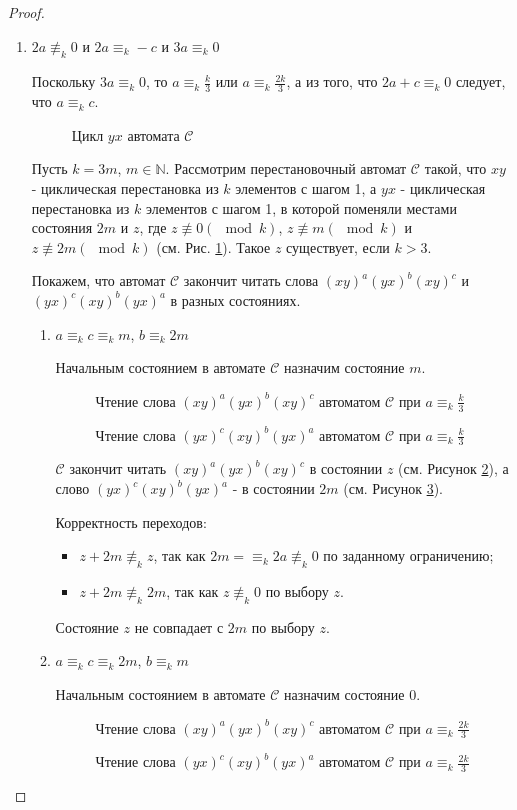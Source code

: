 \documentclass[12pt]{article}
\newcommand{\scalingimage}[3]{
	\begin{figure}
		\center{
			\texttt{[image: \#1]}
		}
		\caption{#3}
		\label{fig:#1}
	\end{figure}
}
\begin{document}
\begin{proof}
\begin{enumerate}
			\item $2a \not \equiv_k 0$ и $2a \equiv_k -c$ и $3a \equiv_k 0$
			
			Поскольку $3a \equiv_k 0$, то $a \equiv_k \frac{k}{3}$ или $a \equiv_k \frac{2k}{3}$, а из того, что $2a+c \equiv_k 0$ следует, что $a \equiv_k c$.
			
			\scalingimage{cycle_2m_z}{0.5}{Цикл $yx$ автомата $\mathscr{C}$}
			
			Пусть $k = 3m$, $m \in \mathbb{N}$.
			Рассмотрим перестановочный автомат $\mathscr{C}$ такой, что $xy$ - циклическая перестановка из $k$ элементов с шагом 1, а $yx$ - циклическая перестановка из $k$ элементов с шагом 1, в которой поменяли местами состояния $2m$ и $z$, где $z \not \equiv 0 (\mod k)$, $z \not \equiv m (\mod k)$ и $z \not \equiv 2m (\mod k)$ (см. Рис. \ref{fig:cycle_2m_z}). Такое $z$ существует, если $k > 3$.
			
			Покажем, что автомат $\mathscr{C}$ закончит читать слова $(xy)^a(yx)^b(xy)^c$ и $(yx)^c(xy)^b(yx)^a$ в разных состояниях.
			
			\begin{enumerate}
				\item $a \equiv_k c \equiv_k m$, $b \equiv_k 2m$
				
				Начальным состоянием в автомате $\mathscr{C}$ назначим состояние $m$.
				\scalingimage{process1_2m_z}{0.5}{Чтение слова $(xy)^a(yx)^b(xy)^c$ автоматом $\mathscr{C}$ при $a \equiv_k \frac{k}{3}$}
				\scalingimage{process2_2m_z}{0.5}{Чтение слова $(yx)^c(xy)^b(yx)^a$ автоматом $\mathscr{C}$ при $a \equiv_k \frac{k}{3}$}
				
				$\mathscr{C}$ закончит читать $(xy)^a(yx)^b(xy)^c$ в состоянии $z$ (см. Рисунок \ref{fig:process1_2m_z}), а слово $(yx)^c(xy)^b(yx)^a$ - в состоянии $2m$ (см. Рисунок \ref{fig:process2_2m_z}).
				
				Корректность переходов:
				\begin{itemize}
					\item $z + 2m \not \equiv_k z$, так как $2m = \equiv_k 2a \not \equiv_k 0$ по заданному ограничению;
					\item $z + 2m \not \equiv_k 2m$, так как $z \not \equiv_k 0$ по выбору $z$.
				\end{itemize}
				Состояние $z$ не совпадает с $2m$ по выбору $z$.
				
				\item $a \equiv_k c \equiv_k 2m$, $b \equiv_k m$
				
				Начальным состоянием в автомате $\mathscr{C}$ назначим состояние $0$.
				\scalingimage{process1_2m_z_init_0}{0.5}{Чтение слова $(xy)^a(yx)^b(xy)^c$ автоматом $\mathscr{C}$ при $a \equiv_k \frac{2k}{3}$}
				\scalingimage{process2_2m_z_init_0}{0.5}{Чтение слова $(yx)^c(xy)^b(yx)^a$ автоматом $\mathscr{C}$ при $a \equiv_k \frac{2k}{3}$}
				

\end{enumerate}
\end{enumerate}
\end{proof}
\end{document}
